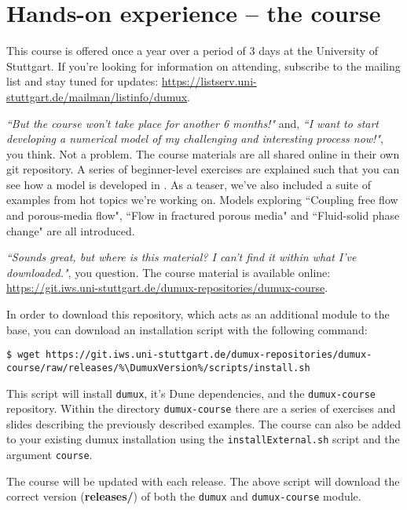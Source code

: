 \section{Hands-on \Dumux experience -- the \Dumux course}
This course is offered once a year over a period of 3 days at the University of Stuttgart.
If you're looking for information on attending, subscribe to the \Dumux mailing list
and stay tuned for updates:
\url{https://listserv.uni-stuttgart.de/mailman/listinfo/dumux}. \par
%
\textit{``But the course won't take place for another 6 months!"} and,
\textit{``I want to start developing a numerical model of my challenging and
  interesting process now!"}, you think.
Not a problem. The course materials are all shared online in their own
git repository. A series of beginner-level exercises are explained
such that you can see how a model is developed in \Dumux. As a teaser, we've
 also included a suite of examples from hot topics we're working on. Models
  exploring ``Coupling free flow and porous-media flow", ``Flow in fractured
   porous media" and ``Fluid-solid phase change" are all introduced.  \par
\textit{``Sounds great, but where is this material? I can't find it within
what I've downloaded."}, you question.
The \Dumux course material is available online:
\url{https://git.iws.uni-stuttgart.de/dumux-repositories/dumux-course}. \par
In order to download this repository, which acts as an additional module to
the \Dumux base, you can download an installation script with the following command:
\begin{lstlisting}[style=Bash,escapechar=\%]
$ wget https://git.iws.uni-stuttgart.de/dumux-repositories/dumux-course/raw/releases/%\DumuxVersion%/scripts/install.sh
\end{lstlisting}
This script will install \texttt{dumux}, it's Dune dependencies, and the \texttt{dumux-course}
repository. Within the directory \texttt{dumux-course} there are a series of exercises
and slides describing the previously described examples. The course can also be added to your existing 
dumux installation using the \texttt{installExternal.sh} script and the argument \texttt{course}.\par
%
The \Dumux course will be updated with each \Dumux release.
The above script will download the correct version (\textbf{releases/\DumuxVersion}) of both
the \texttt{dumux} and \texttt{dumux-course} module.
